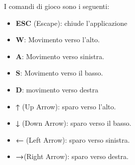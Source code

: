 \documentclass[a4paper,12pt]{report}
\begin{document}
I comandi di gioco sono i seguenti:
\begin{itemize}
    \item \textbf{ESC} (Escape): chiude l'applicazione
    \item \textbf{W}: Movimento verso l'alto.
    \item \textbf{A}: Movimento verso sinistra.
    \item \textbf{S}: Movimento verso il basso.
    \item \textbf{D}: movimento verso destra
    \item \textbf{↑} (Up Arrow): sparo verso l'alto.
    \item \textbf{↓} (Down Arrow): sparo verso il basso.
    \item \textbf{←} (Left Arrow): sparo verso sinistra.
    \item \textbf{→}(Right Arrow): sparo verso destra.
\end{itemize}



\end{document}
